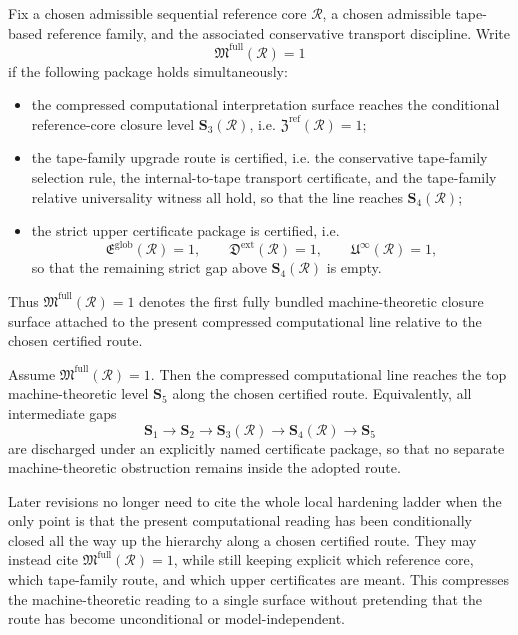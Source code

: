 \begin{definition}
Fix a chosen admissible sequential reference core \(\mathcal R\), a chosen admissible tape-based reference family, and the associated conservative transport discipline. Write
\[
\mathfrak M^{\mathrm{full}}(\mathcal R)=1
\]
if the following package holds simultaneously:
\begin{itemize}[leftmargin=2em]
  \item the compressed computational interpretation surface reaches the conditional reference-core closure level \(\mathbf S_3(\mathcal R)\), i.e. \(\mathfrak Z^{\mathrm{ref}}(\mathcal R)=1\);
  \item the tape-family upgrade route is certified, i.e. the conservative tape-family selection rule, the internal-to-tape transport certificate, and the tape-family relative universality witness all hold, so that the line reaches \(\mathbf S_4(\mathcal R)\);
  \item the strict upper certificate package is certified, i.e.
  \[
  \mathfrak E^{\mathrm{glob}}(\mathcal R)=1,\qquad
  \mathfrak D^{\mathrm{ext}}(\mathcal R)=1,\qquad
  \mathfrak U^{\infty}(\mathcal R)=1,
  \]
  so that the remaining strict gap above \(\mathbf S_4(\mathcal R)\) is empty.
\end{itemize}
Thus \(\mathfrak M^{\mathrm{full}}(\mathcal R)=1\) denotes the first fully bundled machine-theoretic closure surface attached to the present compressed computational line relative to the chosen certified route.
\end{definition}

\begin{theorem}
Assume \(\mathfrak M^{\mathrm{full}}(\mathcal R)=1\). Then the compressed computational line reaches the top machine-theoretic level \(\mathbf S_5\) along the chosen certified route. Equivalently, all intermediate gaps
\[
\mathbf S_1\longrightarrow \mathbf S_2\longrightarrow \mathbf S_3(\mathcal R)\longrightarrow \mathbf S_4(\mathcal R)\longrightarrow \mathbf S_5
\]
are discharged under an explicitly named certificate package, so that no separate machine-theoretic obstruction remains inside the adopted route.
\end{theorem}

\begin{corollary}
Later revisions no longer need to cite the whole local hardening ladder when the only point is that the present computational reading has been conditionally closed all the way up the hierarchy along a chosen certified route. They may instead cite \(\mathfrak M^{\mathrm{full}}(\mathcal R)=1\), while still keeping explicit which reference core, which tape-family route, and which upper certificates are meant. This compresses the machine-theoretic reading to a single surface without pretending that the route has become unconditional or model-independent.
\end{corollary}




